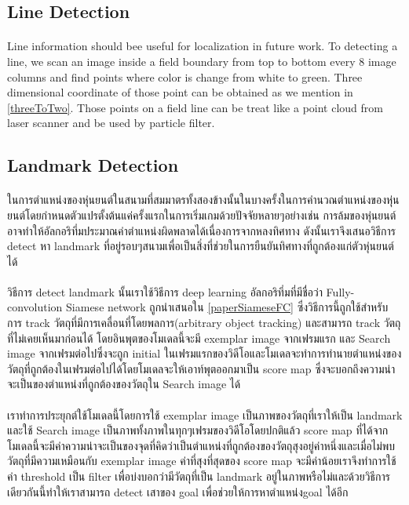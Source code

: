 	\subsection{Line Detection}
	\paragraph{}
	Line information should bee useful for localization in future work. To detecting a line, we scan an image inside a field boundary from top to bottom every 8 image columns and find points where color is change from white to green. Three dimensional coordinate of those point can be obtained as we mention in \ref{threeToTwo}. Those points on a field line can be treat like a point cloud from laser scanner and be used by particle filter.
	
	\subsection{Landmark Detection}
	\paragraph{}
	ในการตำแหน่งของหุ่นยนต์ในสนามที่สมมาตรทั้งสองข้างนั้นในบางครั้งในการคำนวณตำแหน่งของหุ่นยนต์โดยกำหนดตัวแปรตั้งต้นแค่ครั้งแรกในการเริ่มเกมด้วยปัจจัยหลายๆอย่างเช่น การล้มของหุ่นยนต์ อาจทำให้อัลกอริทึ่มประมาณค่าตำแหน่งผิดพลาดได้เนื่องการจากหลงทิศทาง ดังนั้นเราจึงเสนอวิธีการ detect หา landmark ที่อยู่รอบๆสนามเพื่อเป็นสิ่งที่ช่วยในการยืนยันทิศทางที่ถูกต้องแก่ตัวหุ่นยนต์ได้
	\paragraph{}
	วิธีการ detect landmark นั้นเราใช้วิธีการ deep learning อัลกอริทึ่มที่มีชื่อว่า Fully-convolution Siamese network ถูกนำเสนอใน \ref{paperSiameseFC} ซึ่งวิธีการนี้ถูกใช้สำหรับการ track วัตถุที่มีการเคลื่อนที่โดยพลการ(arbitrary object tracking) และสามารถ track วัตถุที่ไม่เคยเห็นมาก่อนได้ โดยอินพุตของโมเดลนี้จะมี exemplar image จากเฟรมแรก และ Search image จากเฟรมต่อไปซึ่งจะถูก initial ในเฟรมแรกของวิดีโอและโมเดลจะทำการทำนายตำแหน่งของวัตถุที่ถูกต้องในเฟรมต่อไปได้โดยโมเดลจะให้เอาท์พุตออกมาเป็น score map ซึ่งจะบอกถึงความน่าจะเป็นของตำแหน่งที่ถูกต้องของวัตถุใน Search image ได้
	\paragraph{}
	เราทำการประยุกต์ใช้โมเดลนี้โดยการใช้ exemplar image เป็นภาพของวัตถุที่เราให้เป็น landmark และใช้ Search image เป็นภาพทั้งภาพในทุกๆเฟรมของวิดีโอโดยปกติแล้ว score map ที่ได้จากโมเดลนี้จะมีค่าความน่าจะเป็นของจุดที่คิดว่าเป็นตำแหน่งที่ถูกต้องของวัตถุสุงอยู่ค่าหนึ่งและเมื่อไม่พบวัตถุที่มีความเหมือนกับ exemplar image ค่าที่สุงที่สุดของ score map จะมีค่าน้อยเราจึงทำการใช้ค่า threshold เป็น filter เพื่อบ่งบอกว่ามีวัตถุที่เป็น landmark อยู่ในภาพหรือไม่และด้วยวิธีการเดียวกันนี้ทำให้เราสามารถ detect เสาของ goal เพื่อช่วยให้การหาตำแหน่งgoal ได้อีก 
	
	
	